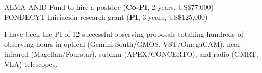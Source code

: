 \documentclass[11pt]{article}
\begin{document}
\pagebreak



\hline



\noindent
{} ALMA-ANID Fund to hire a postdoc (\textbf{Co-PI}, 2 years, US\$77,000)\\
 FONDECYT Iniciaci\'on research grant (\textbf{PI}, 3 years, US\$125,000)



%

\noindent
I have been the PI of 12 successful observing proposals totalling hundreds of 
observing hours in optical (Gemini-South/GMOS, VST/OmegaCAM), near-infrared 
(Magellan/Fourstar), submm (APEX/CONCERTO), and radio (GMRT, VLA) telescopes.
\end{document}
